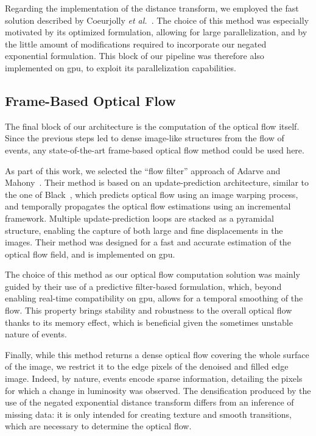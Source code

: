 Regarding the implementation of the distance transform, we employed the fast solution described by Coeurjolly \textit{et al.}~\cite{Coeurjolly2007GomtrieDE}. The choice of this method was especially motivated by its optimized formulation, allowing for large parallelization, and by the little amount of modifications required to incorporate our negated exponential formulation. This block of our pipeline was therefore also implemented on \acrshort{gpu}, to exploit its parallelization capabilities.

\subsection{Frame-Based Optical Flow}\label{sec:ebof:of}
The final block of our architecture is the computation of the optical flow itself. Since the previous steps led to dense image-like structures from the flow of events, any state-of-the-art frame-based optical flow method could be used here.

As part of this work, we selected the ``flow filter'' approach of Adarve and Mahony~\cite{Adarve2016AFF}. Their method is based on an update-prediction architecture, similar to the one of Black~\cite{Black1992RobustIO}, which predicts optical flow using an image warping process, and temporally propagates the optical flow estimations using an incremental framework. Multiple update-prediction loops are stacked as a pyramidal structure, enabling the capture of both large and fine displacements in the images. Their method was designed for a fast and accurate estimation of the optical flow field, and is implemented on \acrshort{gpu}.

The choice of this method as our optical flow computation solution was mainly guided by their use of a predictive filter-based formulation, which, beyond enabling real-time compatibility on \acrshort{gpu}, allows for a temporal smoothing of the flow. This property brings stability and robustness to the overall optical flow thanks to its memory effect, which is beneficial given the sometimes unstable nature of events.

Finally, while this method returns a dense optical flow covering the whole surface of the image, we restrict it to the edge pixels of the denoised and filled edge image. Indeed, by nature, events encode sparse information, detailing the pixels for which a change in luminosity was observed. The densification produced by the use of the negated exponential distance transform differs from an inference of missing data: it is only intended for creating texture and smooth transitions, which are necessary to determine the optical flow.


